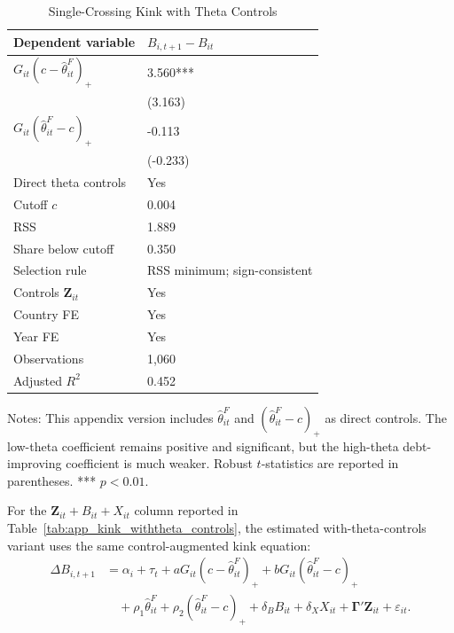 \begin{table}[H]\centering
\begin{threeparttable}
\caption{Single-Crossing Kink with Theta Controls}
\label{tab:app_kink_withtheta_main}
\scriptsize
\setlength{\tabcolsep}{3.0pt}
\begin{tabularx}{0.78\textwidth}{lY}
\toprule
Dependent variable & $B_{i,t+1}-B_{it}$ \\
\midrule
$G_{it}(c-\widehat\theta^F_{it})_+$ & 3.560*** \\
 & (3.163) \\
$G_{it}(\widehat\theta^F_{it}-c)_+$ & -0.113 \\
 & (-0.233) \\
\midrule
Direct theta controls & Yes \\
Cutoff $c$ & 0.004 \\
RSS & 1.889 \\
Share below cutoff & 0.350 \\
Selection rule & RSS minimum; sign-consistent \\
Controls $\mathbf{Z}_{it}$ & Yes \\
Country FE & Yes \\
Year FE & Yes \\
Observations & 1,060 \\
Adjusted $R^2$ & 0.452 \\
\bottomrule
\end{tabularx}
\begin{tablenotes}[flushleft]\footnotesize
\item Notes: This appendix version includes $\widehat{\theta}^{F}_{it}$ and $(\widehat{\theta}^{F}_{it}-c)_+$ as direct controls. The low-theta coefficient remains positive and significant, but the high-theta debt-improving coefficient is much weaker. Robust $t$-statistics are reported in parentheses. *** $p<0.01$.
\end{tablenotes}
\end{threeparttable}
\end{table}

For the $\mathbf{Z}_{it}+B_{it}+X_{it}$ column reported in Table~\ref{tab:app_kink_withtheta_controls}, the estimated with-theta-controls variant uses the same control-augmented kink equation:
\begin{equation}
\begin{aligned}
\Delta B_{i,t+1}
&=
\alpha_i+\tau_t
+aG_{it}(c-\widehat\theta^F_{it})_+
+bG_{it}(\widehat\theta^F_{it}-c)_+ \\
&\quad
+\rho_1\widehat\theta^F_{it}
+\rho_2(\widehat\theta^F_{it}-c)_+
+\delta_B B_{it}
+\delta_X X_{it}
+\boldsymbol{\Gamma}'\mathbf{Z}_{it}
+\varepsilon_{it}.
\end{aligned}
\label{eq:app_kink_withtheta_zbx_variants}
\end{equation}

